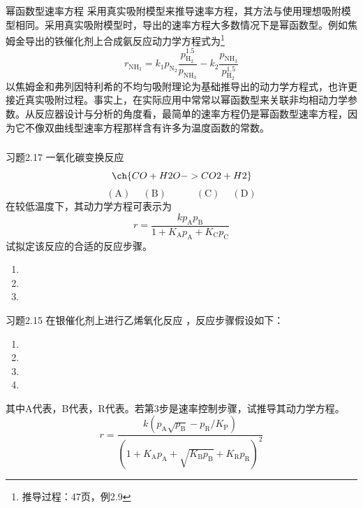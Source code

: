 \begin{frame}{幂函数型速率方程}
    采用真实吸附模型来推导速率方程，其方法与使用理想吸附模型相同。采用真实吸附模型时，导出的速率方程大多数情况下是幂函数型。例如焦姆金导出的铁催化剂上合成氨反应动力学方程式为\footnote{推导过程：47页，例2.9}
    \[
        r_\mathrm{NH_3}=k_1p_\mathrm{N_2}\frac{p_\mathrm{H_2}^{1.5}}{p_\mathrm{NH_3}}-k_2\frac{p_\mathrm{NH_3}}{p_\mathrm{H_2}^{1.5}}
    \]
    以焦姆金和弗列因特利希的不均匀吸附理论为基础推导出的动力学方程式，也许更接近真实吸附过程。事实上，在实际应用中常常以幂函数型来关联非均相动力学参数。从反应器设计与分析的角度看，最简单的速率方程仍是幂函数型速率方程，因为它不像双曲线型速率方程那样含有许多为温度函数的常数。
\end{frame}


\begin{frame}[t]
    \frametitle{}
    \begin{redblock}{习题2.17}
        一氧化碳变换反应
        \[
            \ch{CO + H2O -> CO2 + H2}
        \]
        \[
            (\mathrm{A}) \quad \ (\mathrm{B}) \qquad \quad (\mathrm{C}) \quad \ (\mathrm{D})
        \]
        在较低温度下，其动力学方程可表示为
        \[
            r = \frac{k p_\mathrm{A} p_\mathrm{B}}{1 + K_\mathrm{A} p_\mathrm{A} + K_\mathrm{C} p_\mathrm{C}}
        \]
        试拟定该反应的合适的反应步骤。
        \tcblower
        \pause
        \begin{enumerate}
          \item {}
          \item {}
          \item {}
        \end{enumerate}
    \end{redblock}
\end{frame}


\begin{frame}[t]{}
    \begin{redblock}{习题2.15}
        在银催化剂上进行乙烯氧化反应 ，反应步骤假设如下：
    
    \begin{enumerate}
        \item {}
        \item {}
        \item {}
        \item {}
    \end{enumerate}
    其中A代表，B代表，R代表。若第3步是速率控制步骤，试推导其动力学方程。
    \tcblower
    \pause
    \[
        r = \frac{k(p_{\mathrm{A}}\sqrt{p_{\mathrm{B}}} -p_{\mathrm{R}} / K_{\mathrm{P}})}{(1+K_{\mathrm{A}} p_{\mathrm{A}} + \sqrt{K_{\mathrm{B}} p_{\mathrm{B}}} + K_{\mathrm{R}} p_{\mathrm{R}})^{2}}
    \]
    \end{redblock}
\end{frame}
